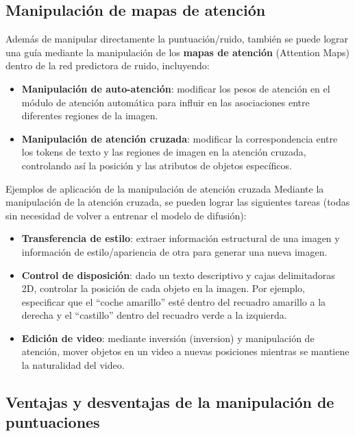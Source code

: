 \documentclass[a4paper]{article}
\begin{document}
\subsection{Manipulación de mapas de atención}

Además de manipular directamente la puntuación/ruido, también se puede lograr una guía mediante la manipulación de los \textbf{mapas de atención} (Attention Maps) dentro de la red predictora de ruido, incluyendo:

\begin{itemize}
    \item \textbf{Manipulación de auto-atención}: modificar los pesos de atención en el módulo de atención automática para influir en las asociaciones entre diferentes regiones de la imagen.
    \item \textbf{Manipulación de atención cruzada}: modificar la correspondencia entre los tokens de texto y las regiones de imagen en la atención cruzada, controlando así la posición y las atributos de objetos específicos.
\end{itemize}

\begin{knowledgebox}{Ejemplos de aplicación de la manipulación de atención cruzada}
Mediante la manipulación de la atención cruzada, se pueden lograr las siguientes tareas (todas sin necesidad de volver a entrenar el modelo de difusión):
\begin{itemize}
    \item \textbf{Transferencia de estilo}: extraer información estructural de una imagen y información de estilo/apariencia de otra para generar una nueva imagen.
    \item \textbf{Control de disposición}: dado un texto descriptivo y cajas delimitadoras 2D, controlar la posición de cada objeto en la imagen. Por ejemplo, especificar que el ``coche amarillo'' esté dentro del recuadro amarillo a la derecha y el ``castillo'' dentro del recuadro verde a la izquierda.
    \item \textbf{Edición de video}: mediante inversión (inversion) y manipulación de atención, mover objetos en un video a nuevas posiciones mientras se mantiene la naturalidad del video.
\end{itemize}
\end{knowledgebox}

\subsection{Ventajas y desventajas de la manipulación de puntuaciones}
\end{document}
